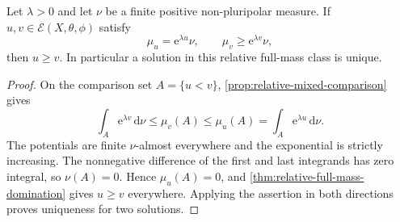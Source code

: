 \begin{proposition}\label{prop:relative-exponential-equation-domination}
Let $\lambda>0$ and let $\nu$ be a finite positive non-pluripolar measure. If $u,v\in\mathcal E(X,\theta,\phi)$ satisfy
\[
 \mu_u=\mathrm e^{\lambda u}\nu,
       \qquad \mu_v\geq\mathrm e^{\lambda v}\nu,
\]
then $u\geq v$. In particular a solution in this relative full-mass class is unique.
\end{proposition}
\begin{proof}
On the comparison set $A=\{u<v\}$, \cref{prop:relative-mixed-comparison} gives
\[
 \int_A\mathrm e^{\lambda v}\,\mathrm d\nu
   \leq\mu_v(A)\leq\mu_u(A)
   =\int_A\mathrm e^{\lambda u}\,\mathrm d\nu.
\]
The potentials are finite $\nu$-almost everywhere and the exponential is strictly increasing. The nonnegative difference of the first and last integrands has zero integral, so $\nu(A)=0$. Hence $\mu_u(A)=0$, and \cref{thm:relative-full-mass-domination} gives $u\geq v$ everywhere. Applying the assertion in both directions proves uniqueness for two solutions.
\end{proof}

